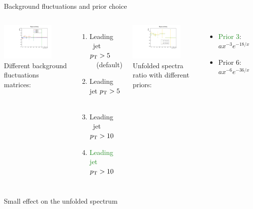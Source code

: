 \documentclass[xcolor={usenames,dvipsnames}, aspectratio=169]{beamer}
\begin{document}
\begin{frame}{Background fluctuations and prior choice}
\begin{columns}[t]
\centering
\includegraphics[width=0.75\textwidth]{img/pPb/3_36_step1_3_50_ratio_bkg.pdf}\\
\footnotesize
Different background fluctuations matrices:
\scriptsize
\begin{enumerate}
\item Leading \Dzero\ jet $p_{\rm T} > 5$~\GeVc\ (default)
\item \textcolor{BrickRed}{Leading jet $p_{\rm T} > 5$~\GeVc}
\item \textcolor{NavyBlue}{Leading \Dzero\ jet $p_{\rm T} > 10$~\GeVc}
\item \textcolor{ForestGreen}{Leading jet $p_{\rm T} > 10$~\GeVc}
\end{enumerate}
\centering
\includegraphics[width=0.75\textwidth]{img/pPb/priorRatio.pdf}\\
\footnotesize
Unfolded spectra ratio with different priors:\\
\scriptsize
\begin{itemize}
\item \textcolor{ForestGreen}{Prior 3}: $ax^{-3}e^{-18/x}$
\item \textcolor{YellowOrange}{Prior 6}: $ax^{-6}e^{-36/x}$
\end{itemize}
\end{columns}
\vspace{5pt}
\centering
\small
Small effect on the unfolded spectrum
\end{frame}
\end{document}
